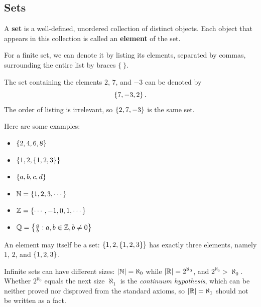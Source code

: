 \subsection{Sets}
\begin{definition}[Set]
    A \textbf{set} is a well-defined, unordered collection of distinct objects. Each object that appears 
    in this collection is called an \textbf{element} of the set. 
\end{definition}

For a finite set, we can denote it by listing its elements, separated by commas,
surrounding the entire list by braces $\{\ \}$.

\begin{example}
    The set containing the elements $2$, $7$, and $-3$ can be denoted by
    \begin{equation*}
        \left\{7, -3, 2\right\}.
    \end{equation*}
    The order of listing is irrelevant, so $\left\{2, 7, -3\right\}$ is the same set.
\end{example}

\begin{example}
    Here are some examples:
    \begin{itemize}
        \item $\left\{2, 4, 6, 8\right\}$ 
        \item $\left\{1, 2, \left\{1, 2, 3\right\}\right\}$
        \item $\left\{a, b, c, d\right\}$
        \item $\mathbb{N} = \left\{1, 2, 3, \cdots\right\}$
        \item $\mathbb{Z} = \left\{\cdots, -1, 0, 1, \cdots\right\}$
        \item $\mathbb{Q} = \left\{\frac{a }{b } : a, b \in \mathbb{Z}, b \neq 0\right\}$
    \end{itemize}
    An element may itself be a set: $\left\{1, 2, \left\{1, 2, 3\right\}\right\}$ has exactly three elements,
    namely $1$, $2$, and $\left\{1, 2, 3\right\}$.
\end{example}

\begin{remark}
    Infinite sets can have different sizes: $\left|\mathbb{N}\right| = \aleph_0$ while $\left|\mathbb{R}\right| = 2^{\aleph_0}$,
    and $2^{\aleph_0} > \aleph_0$. Whether $2^{\aleph_0}$ equals the next size $\aleph_1$ is the
    \emph{continuum hypothesis}, which can be neither proved nor disproved from the standard
    axioms, so $\left|\mathbb{R}\right| = \aleph_1$ should not be written as a fact.
\end{remark}

